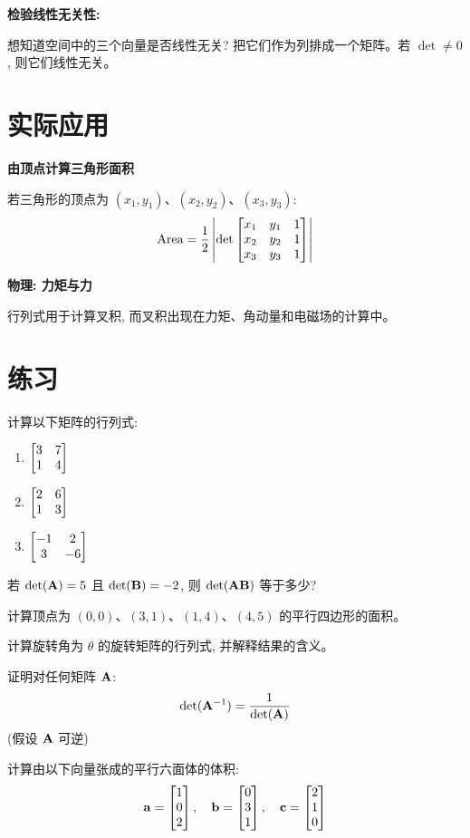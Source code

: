 \begin{practical}
\textbf{检验线性无关性:}

想知道空间中的三个向量是否线性无关? 把它们作为列排成一个矩阵。若 $\det \neq 0$, 则它们线性无关。
\end{practical}

\section{实际应用}

\begin{practical}
\textbf{由顶点计算三角形面积}

若三角形的顶点为 $(x_1, y_1)$、$(x_2, y_2)$、$(x_3, y_3)$:
\[
\text{Area} = \frac{1}{2} \left| \det\begin{bmatrix} x_1 & y_1 & 1 \\ x_2 & y_2 & 1 \\ x_3 & y_3 & 1 \end{bmatrix} \right|
\]
\end{practical}

\begin{practical}
\textbf{物理: 力矩与力}

行列式用于计算叉积, 而叉积出现在力矩、角动量和电磁场的计算中。
\end{practical}

\section{练习}

\begin{exercise}
计算以下矩阵的行列式:
\begin{enumerate}[label=(\alph*)]
    \item $\begin{bmatrix} 3 & 7 \\ 1 & 4 \end{bmatrix}$
    \item $\begin{bmatrix} 2 & 6 \\ 1 & 3 \end{bmatrix}$
    \item $\begin{bmatrix} -1 & 2 \\ 3 & -6 \end{bmatrix}$
\end{enumerate}
\end{exercise}

\begin{exercise}
若 $\det(\mathbf{A}) = 5$ 且 $\det(\mathbf{B}) = -2$, 则 $\det(\mathbf{A}\mathbf{B})$ 等于多少?
\end{exercise}

\begin{exercise}
计算顶点为 $(0,0)$、$(3,1)$、$(1,4)$、$(4,5)$ 的平行四边形的面积。
\end{exercise}

\begin{exercise}
计算旋转角为 $\theta$ 的旋转矩阵的行列式, 并解释结果的含义。
\end{exercise}

\begin{exercise}[挑战]
证明对任何矩阵 $\mathbf{A}$:
\[
\det(\mathbf{A}^{-1}) = \frac{1}{\det(\mathbf{A})}
\]
(假设 $\mathbf{A}$ 可逆)
\end{exercise}

\begin{problem}
计算由以下向量张成的平行六面体的体积:
\[
\mathbf{a} = \begin{bmatrix} 1 \\ 0 \\ 2 \end{bmatrix}, \quad \mathbf{b} = \begin{bmatrix} 0 \\ 3 \\ 1 \end{bmatrix}, \quad \mathbf{c} = \begin{bmatrix} 2 \\ 1 \\ 0 \end{bmatrix}
\]
\end{problem}
